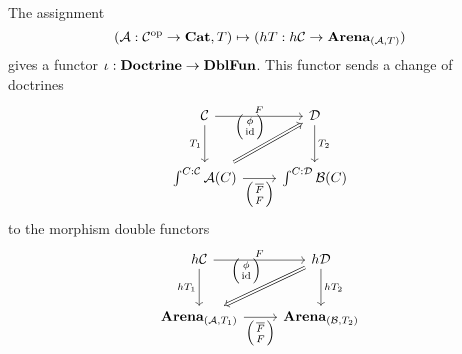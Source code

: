 \documentclass[DynamicalBook]{subfiles}
\begin{document}
\begin{lemma}
The assignment 
\[
(\mathcal{A} : \mathcal{C}^{\textnormal{op}} \to \textbf{Cat}, T) \mapsto (hT : h\mathcal{C} \to
\textbf{Arena}_{(\mathcal{A}, T)})
\]
gives a functor $\iota : \textbf{Doctrine} \to \textbf{DblFun}$. This functor sends a
change of doctrines
\begin{equation}\label{eqn.change_of_doctrines}
  \begin{tikzcd}[row sep = large]
    \cat{C} \ar[r, "F"]\ar[d, "T_1"'] & \cat{D} \ar[d, "T_2"] \\
    \int^{C : \cat{C}}\cat{A}(C)\ar[r, "{\lens{\overline{F}}{F}}"']
    \ar[ur, Rightarrow, "{\littlelens{\phi}{\id}}"] &\int^{C : \cat{D}}\cat{B}(C)
  \end{tikzcd}
\end{equation}
to the morphism double functors
\begin{equation}\label{eqn.change_of_doctrines_dblfun}
  \begin{tikzcd}[row sep = large]
    h\cat{C} \ar[r, "F"]\ar[d, "hT_1"'] & h\cat{D} \ar[d, "hT_2"]\ar[dl, Rightarrow, "{\littlelens{\phi}{\id}}"'] \\
    \Cat{Arena}_{(\cat{A}, T_1)}\ar[r, "{\lens{\overline{F}}{F}}"']
     & \Cat{Arena}_{(\cat{B}, T_2)}
  \end{tikzcd}
\end{equation}
\end{lemma}
\end{document}

